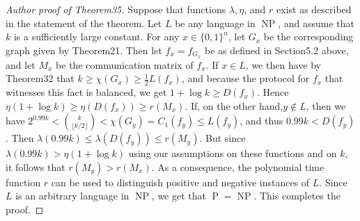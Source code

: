 \begin{proof}[Author proof of Theorem35]
Suppose that functions $\lambda,\eta$, and $r$ exist as described in the statement of the theorem. Let $L$ be any language in $\operatorname{NP}$, and assume that $k$ is a sufficiently large constant. For any $x\in\{0,1\}^n$, let $G_x$ be the corresponding graph given by Theorem21. Then let $f_x=f_{G_x}$ be as defined in Section5.2 above, and let $M_x$ be the communication matrix of $f_x$. If $x\in L$, we then have by Theorem32 that $k\geq\chi(G_x)\geq\frac12L(f_x)$, and because the protocol for $f_x$ that witnesses this fact is balanced, we get $1+\log k\geq D(f_x)$. Hence $\eta(1+\log k)\geq\eta(D(f_x))\geq r(M_x)$. If, on the other hand,$y\notin L$, then we have $2^{0.99k}<\binom k{\lfloor k/2\rfloor}<\chi(G_y)=C_1(f_y)\leq L(f_y)$, and thus $0.99k<D(f_y)$. Then $\lambda(0.99k)\leq\lambda(D(f_y))\leq r(M_y)$. But since $\lambda(0.99k)>\eta(1+\log k)$ using our assumptions on these functions and on $k$, it follows that $r(M_y)>r(M_x)$. As a consequence, the polynomial time function $r$ can be used to distinguish positive and negative instances of $L$. Since $L$ is an arbitrary language in $\operatorname{NP}$, we get that $\operatorname P=\operatorname{NP}$. This completes the proof.
\end{proof}
